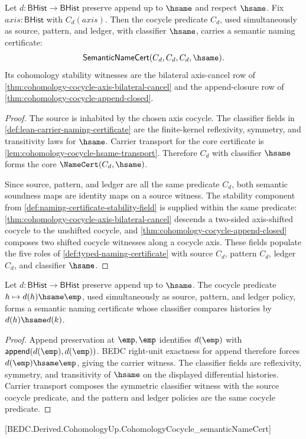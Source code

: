 \begin{theorem}
\label{thm:cohomology-cocycle-predicate-semantic-namecert}
Let $d:\mathsf{BHist}\to\mathsf{BHist}$ preserve append up to $\hsame$ and respect $\hsame$. Fix $axis:\mathsf{BHist}$ with $C_d(axis)$. Then the cocycle predicate $C_d$, used simultaneously as source, pattern, and ledger, with classifier $\hsame$, carries a semantic naming certificate:
$$
\mathsf{SemanticNameCert}(C_d,C_d,C_d,\hsame).
$$
Its cohomology stability witnesses are the bilateral axis-cancel row of \autoref{thm:cohomology-cocycle-axis-bilateral-cancel} and the append-closure row of \autoref{thm:cohomology-cocycle-append-closed}.
\end{theorem}
\begin{proof}
The source is inhabited by the chosen axis cocycle. The classifier fields in \autoref{def:lean-carrier-naming-certificate} are the finite-kernel reflexivity, symmetry, and transitivity laws for $\hsame$. Carrier transport for the core certificate is \autoref{lem:cohomology-cocycle-hsame-transport}. Therefore $C_d$ with classifier $\hsame$ forms the core $\NameCert(C_d,\hsame)$.

Since source, pattern, and ledger are all the same predicate $C_d$, both semantic soundness maps are identity maps on a source witness. The stability component from \autoref{def:naming-certificate-stability-field} is supplied within the same predicate: \autoref{thm:cohomology-cocycle-axis-bilateral-cancel} descends a two-sided axis-shifted cocycle to the unshifted cocycle, and \autoref{thm:cohomology-cocycle-append-closed} composes two shifted cocycle witnesses along a cocycle axis. These fields populate the five roles of \autoref{def:typed-naming-certificate} with source $C_d$, pattern $C_d$, ledger $C_d$, and classifier $\hsame$.
\end{proof}
\begin{theorem}
\label{thm:cohomology-cocycle-semantic-namecert}
Let $d:\mathsf{BHist}\to\mathsf{BHist}$ preserve append up to $\hsame$. The
cocycle predicate $h\mapsto d(h)\hsame\emp$, used simultaneously as source,
pattern, and ledger policy, forms a semantic naming certificate whose
classifier compares histories by $d(h)\hsame d(k)$.
\end{theorem}
\begin{proof}
Append preservation at $\emp,\emp$ identifies $d(\emp)$ with
$\mathsf{append}(d(\emp),d(\emp))$. BEDC right-unit exactness for append
therefore forces $d(\emp)\hsame\emp$, giving the carrier witness. The
classifier fields are reflexivity, symmetry, and transitivity of $\hsame$ on
the displayed differential histories. Carrier transport composes the symmetric
classifier witness with the source cocycle predicate, and the pattern and
ledger policies are the same cocycle predicate.
\end{proof}
[BEDC.Derived.CohomologyUp.CohomologyCocycle\_semanticNameCert]

